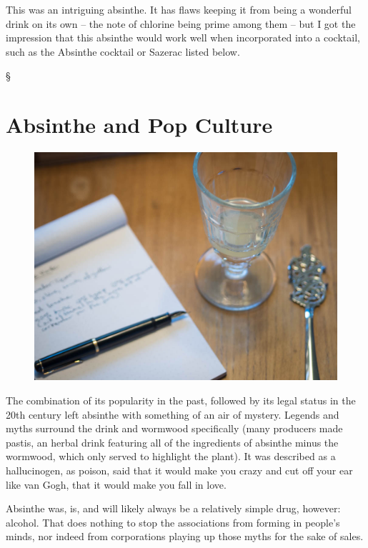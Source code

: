 \documentclass[12pt,letterpaper,oneside]{memoir}
\newcommand\secdiv{
  \begin{center}
    \S
  \end{center}
}
\begin{document}
  This was an intriguing absinthe.  It has flaws keeping it from being a wonderful drink on its own -- the note of chlorine being prime among them -- but I got the impression that this absinthe would work well when incorporated into a cocktail, such as the Absinthe cocktail or Sazerac listed below.

  \secdiv

  \section*{Absinthe and Pop Culture}

  \begin{figure}
    \includegraphics[width=\linewidth]{../../assets/tasting/naa-tasting.jpg}
  \end{figure}

  The combination of its popularity in the past, followed by its legal status in the 20th century left absinthe with something of an air of mystery.  Legends and myths surround the drink and wormwood specifically (many producers made pastis, an herbal drink featuring all of the ingredients of absinthe minus the wormwood, which only served to highlight the plant).  It was described as a hallucinogen, as poison, said that it would make you crazy and cut off your ear like van Gogh, that it would make you fall in love.

  Absinthe was, is, and will likely always be a relatively simple drug, however: alcohol.  That does nothing to stop the associations from forming in people's minds, nor indeed from corporations playing up those myths for the sake of sales.
\end{document}
